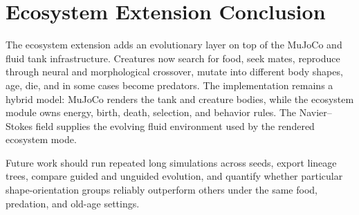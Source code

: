 \documentclass[12pt]{article}
\begin{document}
\section{Ecosystem Extension Conclusion}

The ecosystem extension adds an evolutionary layer on top of the MuJoCo and
fluid tank infrastructure.  Creatures now search for food, seek mates, reproduce
through neural and morphological crossover, mutate into different body shapes,
age, die, and in some cases become predators.  The implementation remains a
hybrid model: MuJoCo renders the tank and creature bodies, while the ecosystem
module owns energy, birth, death, selection, and behavior rules.  The
Navier--Stokes field supplies the evolving fluid environment used by the
rendered ecosystem mode.

Future work should run repeated long simulations across seeds, export lineage
trees, compare guided and unguided evolution, and quantify whether particular
shape-orientation groups reliably outperform others under the same food,
predation, and old-age settings.
\end{document}
